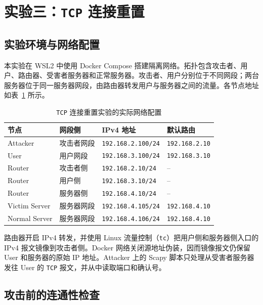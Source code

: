 \section{实验三：\texttt{TCP} 连接重置}

\subsection{实验环境与网络配置}

本实验在 WSL2 中使用 Docker Compose 搭建隔离网络。拓扑包含攻击者、用户、路由器、受害者服务器和正常服务器。攻击者、用户分别位于不同网段；两台服务器位于同一服务器网段，由路由器转发用户与服务器之间的流量。各节点地址如表~\ref{tab:task3-network} 所示。

\begin{table}[H]
    \centering
    \caption{\texttt{TCP} 连接重置实验的实际网络配置}
    \label{tab:task3-network}
    \renewcommand{\arraystretch}{1.2}
    \begin{tabularx}{\linewidth}{l l l X}
        \toprule
        节点 & 网段侧 & IPv4 地址 & 默认路由 \\
        \midrule
        Attacker & 攻击者网段 & \texttt{192.168.2.100/24} & \texttt{192.168.2.10} \\
        User & 用户网段 & \texttt{192.168.3.100/24} & \texttt{192.168.3.10} \\
        Router & 攻击者侧 & \texttt{192.168.2.10/24} & -- \\
        Router & 用户侧 & \texttt{192.168.3.10/24} & -- \\
        Router & 服务器侧 & \texttt{192.168.4.10/24} & -- \\
        Victim Server & 服务器网段 & \texttt{192.168.4.105/24} & \texttt{192.168.4.10} \\
        Normal Server & 服务器网段 & \texttt{192.168.4.106/24} & \texttt{192.168.4.10} \\
        \bottomrule
    \end{tabularx}
\end{table}

路由器开启 IPv4 转发，并使用 Linux 流量控制（\texttt{tc}）把用户侧和服务器侧入口的 IPv4 报文镜像到攻击者侧。Docker 网络关闭源地址伪装，因而镜像报文仍保留 User 和服务器的原始 IP 地址。Attacker 上的 Scapy 脚本只处理从受害者服务器发往 User 的 \texttt{TCP} 报文，并从中读取端口和确认号。

\subsection{攻击前的连通性检查}

